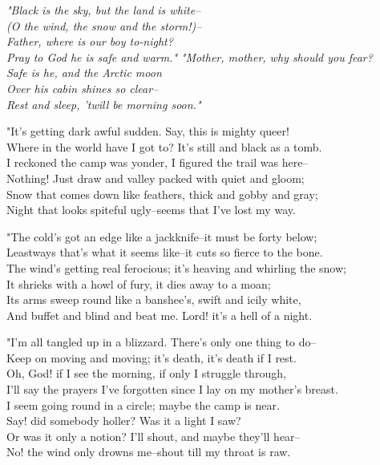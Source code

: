 
\begin{poemblock}
\textit{
"Black is the sky, but the land is white--\\
\idt (O the wind, the snow and the storm!)--\\
Father, where is our boy to-night?\\
\idt Pray to God he is safe and warm."
}
\textit{
"Mother, mother, why should you fear?\\
\idt Safe is he, and the Arctic moon\\
Over his cabin shines so clear--\\
\idt Rest and sleep, 'twill be morning soon."
}

"It's getting dark awful sudden.  Say, this is mighty queer!\\
\idt Where in the world have I got to?  It's still and black as a tomb.\\
I reckoned the camp was yonder, I figured the trail was here--\\
\idt Nothing!  Just draw and valley packed with quiet and gloom;\\
Snow that comes down like feathers, thick and gobby and gray;\\
Night that looks spiteful ugly--seems that I've lost my way.

"The cold's got an edge like a jackknife--it must be forty below;\\
\idt Leastways that's what it seems like--it cuts so fierce to the bone.\\
The wind's getting real ferocious; it's heaving and whirling the snow;\\
\idt It shrieks with a howl of fury, it dies away to a moan;\\
Its arms sweep round like a banshee's, swift and icily white,\\
And buffet and blind and beat me.  Lord! it's a hell of a night.

"I'm all tangled up in a blizzard.  There's only one thing to do--\\
\idt Keep on moving and moving; it's death, it's death if I rest.\\
Oh, God! if I see the morning, if only I struggle through,\\
\idt I'll say the prayers I've forgotten since I lay on my mother's breast.\\
I seem going round in a circle; maybe the camp is near.\\
\idt Say! did somebody holler?  Was it a light I saw?\\
Or was it only a notion?  I'll shout, and maybe they'll hear--\\
\idt No! the wind only drowns me--shout till my throat is raw.


\end{poemblock}
